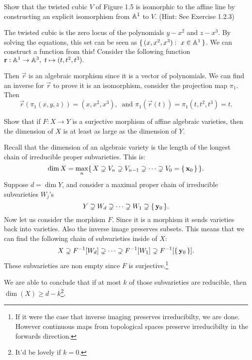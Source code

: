 \documentclass[12pt]{memoir}
\begin{document}
\begin{Ej}
  Show that the twisted cubic $V$ of Figure 1.5 is isomorphic to the affine line by constructing an explicit isomorphism from $\mathbb{A}^1$ to $V$. (Hint: See Exercise 1.2.3)
\end{Ej}

\begin{ptcbr}
The twisted cubic is the zero locus of the polynomials $y-x^2$ and $z-x^3$.
By solving the equations, this set can be seen as $\{\,(x,x^2,x^3):\ x\in\mathbb{A}^1\,\}$. We can construct a function from this! Consider the following function $\vec r:\bA^1\to\bA^3,\ t\mapsto(t,t^2,t^3).$\par 
Then $\vec r$ is an algebraic morphism since it is a vector of polynomials. We can find an inverse for $\vec r$ to prove it is an isomorphism, consider the projection map $\pi_1$. Then 
$$\vec r(\pi_1(x,y,z))=(x,x^2,x^3),\ \text{ and } \pi_1(\vec r(t))=\pi_1(t,t^2,t^3)=t.$$ 
\end{ptcbr}

\begin{Ej}
 Show that if $F:X\to Y$ is a surjective morphism of affine
 algebraic varieties, then the dimension of $ X $ is at least as large as the dimension of $Y$. 
\end{Ej}
%
\begin{ptcbr}
  Recall that the dimension of an algebraic variety is the length of the longest chain of irreducible proper subvarieties. This is:
  $$\dim X=\max_{n}\{\,X\supsetneq V_n\supsetneq V_{n-1}\supsetneq\dots\supsetneq V_0=\{\,\mathbf{x}_0\,\}\,\}.$$
Suppose $d=\dim Y$, and consider a maximal proper chain of irreducible subvarieties $W_j$'s
$$Y\supsetneq W_d\supsetneq\dots\supsetneq W_1\supsetneq \{\,\mathbf{y}_0\,\}.$$
Now let us consider the morphism $F$. Since it is a morphism it sends varieties back into varieties. Also the inverse image preserves subsets. This means that we can find the following chain of subvarieties inside of $X$:
$$X\supsetneq F^{-1}[W_d]\supsetneq\dots\supsetneq F^{-1}[W_1]\supsetneq F^{-1}[\{\,\mathbf{y}_0\,\}].$$
These subvarieties are non empty since $F$ is surjective.\footnote{If it were the case that inverse imaging preserves irreducibilty, we are done. However continuous maps from topological spaces preserve irreducibilty in the forwards direction.}\par 
We are able to conclude that if at most $k$ of those subvarieties are reducible, then $\dim(X)\geq d-k$\footnote{It'd be lovely if $k=0$.}.
\end{ptcbr}
\end{document}
